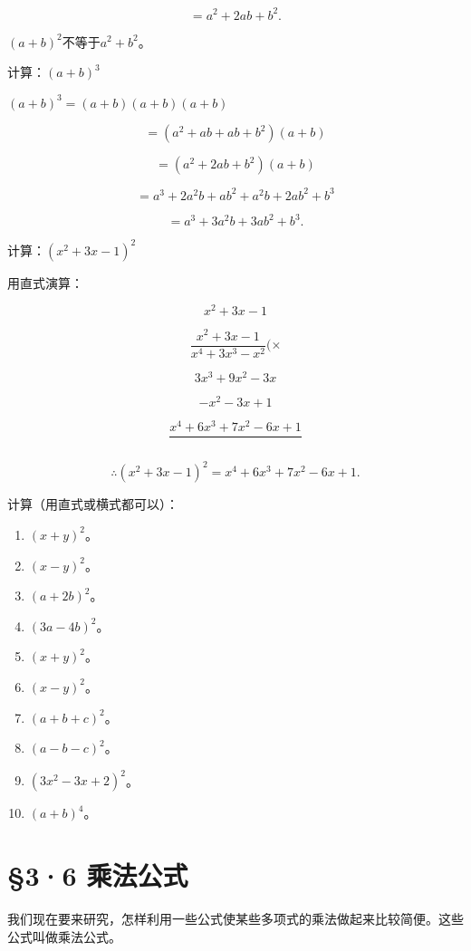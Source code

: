 \[
= a ^{2} + 2 a b + b ^{2}.
\]

\((a + b)^2\)不等于\(a^2 + b^2\)。

 计算：\((a + b)^{3}\)

\((a + b)^{3} = (a + b)(a + b)(a + b)\)

\[
= (a ^{2} + a b + a b + b ^{2}) (a + b)
\]

\[
= (a ^{2} + 2 a b + b ^{2}) (a + b)
\]

\[
= a ^{3} + 2 a ^{2} b + a b ^{2} + a ^{2} b + 2 a b ^{2} + b ^{3}
\]

\[
= a ^{3} + 3 a ^{2} b + 3 a b ^{2} + b ^{3}.
\]

 计算：\((x^{2} + 3x - 1)^{2}\)

 用直式演算：

\[
x ^{2} + 3 x - 1
\]

\[
\frac{x ^{2} + 3 x - 1}{x ^{4} + 3 x ^{3} - x ^{2}} (\times
\]

\[
3 x ^{3} + 9 x ^{2} - 3 x
\]

\[
- x ^{2} - 3 x + 1
\]

\[
\frac{x ^{4} + 6 x ^{3} + 7 x ^{2} - 6 x + 1}{}
\]

\[
\therefore (x ^{2} + 3 x - 1) ^{2} = x ^{4} + 6 x ^{3} + 7 x ^{2} - 6 x + 1.
\]

计算（用直式或横式都可以）：

\begin{enumerate}[start=1]
\item
  \((x + y)^{2}\)。
\item
  \((x - y)^{2}\)。
\item
  \((a + 2b)^{2}\)。
\item
  \((3a - 4b)^{2}\)。
\item
  \((x + y)^{2}\)。
\item
  \((x - y)^{2}\)。
\item
  \((a + b + c)^{2}\)。
\item
  \((a - b - c)^{2}\)。
\item
  \((3x^{2} - 3x + 2)^{2}\)。
\item
  \((a + b)^{4}\)。
\end{enumerate}

\section{§3·6 乘法公式}

我们现在要来研究，怎样利用一些公式使某些多项式的乘法做起来比较简便。这些公式叫做乘法公式。

